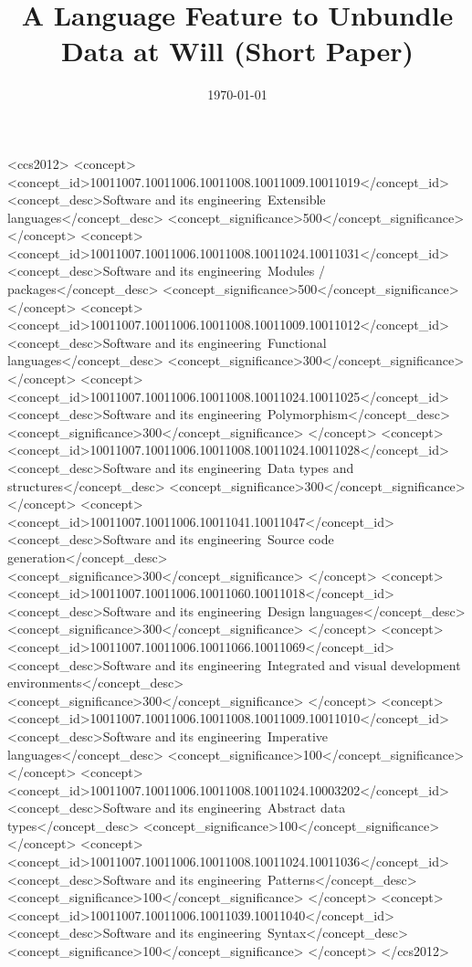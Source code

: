 \documentclass[sigplan,screen]{acmart}
\date{\today}
\title{A Language Feature to Unbundle Data at Will (Short Paper)}
\begin{document}



\begin{CCSXML}
<ccs2012>
<concept>
<concept_id>10011007.10011006.10011008.10011009.10011019</concept_id>
<concept_desc>Software and its engineering~Extensible languages</concept_desc>
<concept_significance>500</concept_significance>
</concept>
<concept>
<concept_id>10011007.10011006.10011008.10011024.10011031</concept_id>
<concept_desc>Software and its engineering~Modules / packages</concept_desc>
<concept_significance>500</concept_significance>
</concept>
<concept>
<concept_id>10011007.10011006.10011008.10011009.10011012</concept_id>
<concept_desc>Software and its engineering~Functional languages</concept_desc>
<concept_significance>300</concept_significance>
</concept>
<concept>
<concept_id>10011007.10011006.10011008.10011024.10011025</concept_id>
<concept_desc>Software and its engineering~Polymorphism</concept_desc>
<concept_significance>300</concept_significance>
</concept>
<concept>
<concept_id>10011007.10011006.10011008.10011024.10011028</concept_id>
<concept_desc>Software and its engineering~Data types and structures</concept_desc>
<concept_significance>300</concept_significance>
</concept>
<concept>
<concept_id>10011007.10011006.10011041.10011047</concept_id>
<concept_desc>Software and its engineering~Source code generation</concept_desc>
<concept_significance>300</concept_significance>
</concept>
<concept>
<concept_id>10011007.10011006.10011060.10011018</concept_id>
<concept_desc>Software and its engineering~Design languages</concept_desc>
<concept_significance>300</concept_significance>
</concept>
<concept>
<concept_id>10011007.10011006.10011066.10011069</concept_id>
<concept_desc>Software and its engineering~Integrated and visual development environments</concept_desc>
<concept_significance>300</concept_significance>
</concept>
<concept>
<concept_id>10011007.10011006.10011008.10011009.10011010</concept_id>
<concept_desc>Software and its engineering~Imperative languages</concept_desc>
<concept_significance>100</concept_significance>
</concept>
<concept>
<concept_id>10011007.10011006.10011008.10011024.10003202</concept_id>
<concept_desc>Software and its engineering~Abstract data types</concept_desc>
<concept_significance>100</concept_significance>
</concept>
<concept>
<concept_id>10011007.10011006.10011008.10011024.10011036</concept_id>
<concept_desc>Software and its engineering~Patterns</concept_desc>
<concept_significance>100</concept_significance>
</concept>
<concept>
<concept_id>10011007.10011006.10011039.10011040</concept_id>
<concept_desc>Software and its engineering~Syntax</concept_desc>
<concept_significance>100</concept_significance>
</concept>
</ccs2012>
\end{CCSXML}
\end{document}
